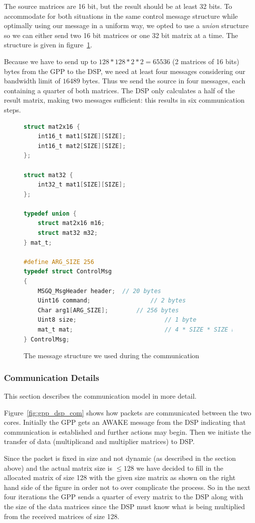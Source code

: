 The source matrices are 16 bit, but the result should be at least 32 bits.
To accommodate for both
situations in the same control message structure while optimally using our
message in a uniform way, we opted to use a \emph{union} structure so we
can either send two 16 bit matrices or one 32 bit matrix at a time. The
structure is given in figure~\ref{code:control_msg}.

Because we have to send up to $128*128*2*2=65536$ (2 matrices of 16 bits)
bytes from the GPP to the DSP, we need at least four messages considering
our bandwidth limit of $16489$ bytes. Thus we send the source in four messages,
each containing a quarter of both matrices. The DSP only calculates a half of
the result matrix, making two messages sufficient: this results in six
communication steps.

\begin{figure}[h]
\begin{lstlisting}[language=C]
struct mat2x16 {
	int16_t mat1[SIZE][SIZE];
	int16_t mat2[SIZE][SIZE];
};

struct mat32 {
	int32_t mat1[SIZE][SIZE];
};

typedef union {
	struct mat2x16 m16;
	struct mat32 m32;
} mat_t;

#define ARG_SIZE 256
typedef struct ControlMsg
{
    MSGQ_MsgHeader header;	// 20 bytes
    Uint16 command;					// 2 bytes
    Char arg1[ARG_SIZE];		// 256 bytes
    Uint8 size;							// 1 byte
    mat_t mat;							// 4 * SIZE * SIZE bytes
} ControlMsg;
\end{lstlisting}
\caption{The message structure we used during the communication}
\label{code:control_msg}
\end{figure}


\subsubsection{Communication Details}
This section describes the communication model in more detail.

Figure~\ref{fig:gpp_dsp_com} shows how packets are communicated between the two cores. Initially the GPP gets an AWAKE message from the DSP indicating that communication is established and further actions may begin.
Then we initiate the transfer of data (multiplicand and multiplier matrices) to DSP. 

Since the packet is fixed in size and not dynamic (as described in the section above) and the actual matrix size is $\leq 128$ we have decided to fill in the allocated matrix of size 128 with the given size matrix as shown on the right hand side of the figure in order not to over complicate the process.
So in the next four iterations the GPP sends a quarter of every matrix to the DSP along with the size of the data matrices since the DSP must know what is being multiplied from the received matrices of size 128. 

